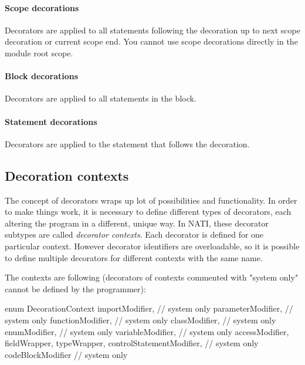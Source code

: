 \paragraph{Scope decorations} Decorators are applied to all statements following the decoration up to next scope decoration or current scope end. You cannot use scope decorations directly in the module root scope.

\paragraph{Block decorations} Decorators are applied to all statements in the block.

\paragraph{Statement decorations} Decorators are applied to the statement that follows the decoration.

\subsection{Decoration contexts} \label{decorationContexts}
The concept of decorators wraps up lot of possibilities and functionality. In order to make things work, it is necessary to define different types of decorators, each altering the program in a different, unique way. In NATI, these decorator subtypes are called \textit{decorator contexts}. Each decorator is defined for one particular context. However decorator identifiers are overloadable, so it is possible to define multiple decorators for different contexts with the same name.

The contexts are following (decorators of contexts commented with "system only" cannot be defined by the programmer):
\begin{code}
enum DecorationContext {
	importModifier, // system only
	parameterModifier, // system only
	functionModifier, // system only
	classModifier, // system only
	enumModifier, // system only
	variableModifier, // system only
	accessModifier,
	fieldWrapper,
	typeWrapper,
	controlStatementModifier, // system only
	codeBlockModifier // system only
}
\end{code} \label{enum:DecorationContext}

